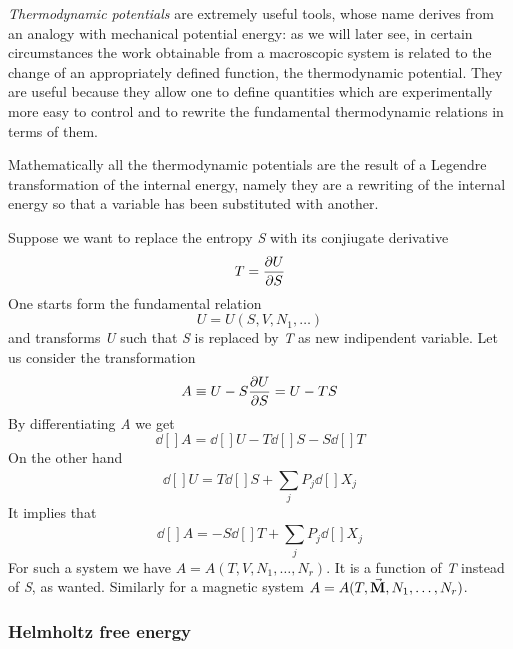 \documentclass[../main/main.tex]{subfiles}
\begin{document}
\emph{Thermodynamic potentials} are extremely useful tools, whose name derives from an analogy with mechanical potential energy: as we will later see, in certain circumstances the work obtainable from a macroscopic system is related to the change of an appropriately defined function, the thermodynamic potential. They are useful because they allow one to define quantities which are experimentally more easy to control and to rewrite the fundamental thermodynamic relations in terms of them.

Mathematically all the thermodynamic potentials are the result of a Legendre transformation of the internal energy, namely they are a rewriting of the internal energy so that a variable has been substituted with another.

\begin{example}
Suppose we want to replace the entropy \emph{S} with its conjiugate derivative
\begin{equation*}
  T = \pdv{U}{S}
\end{equation*}
One starts form the fundamental relation
\begin{equation*}
  U=U(S,V,N_1,\dots)
\end{equation*}
and transforms \emph{U} such that \emph{S} is replaced by \emph{T} as new indipendent variable. Let us consider the transformation
\begin{equation*}
  A \equiv U - S \pdv{U}{S} = U- T S
\end{equation*}
By differentiating \emph{A} we get
\begin{equation*}
  \dd[]{A} = \dd[]{U} - T \dd[]{S}  - S \dd[]{T}
\end{equation*}
On the other hand
\begin{equation*}
  \dd[]{U} = T \dd[]{S} + \sum_{j}^{} P_j \dd[]{X_j}
\end{equation*}
It implies that
\begin{equation*}
  \dd[]{A} = - S \dd[]{T} + \sum_{j}^{} P_j \dd[]{X_j}
\end{equation*}
For such a system we have \( A=A(T,V,N_1,\dots,N_r) \). It is a function of \emph{T} instead of \emph{S}, as wanted.  Similarly for a magnetic system \( A=A(T,\va{M},N_1,\dots,N_r ) \).
\end{example}

\subsubsection{Helmholtz free energy}
\end{document}
